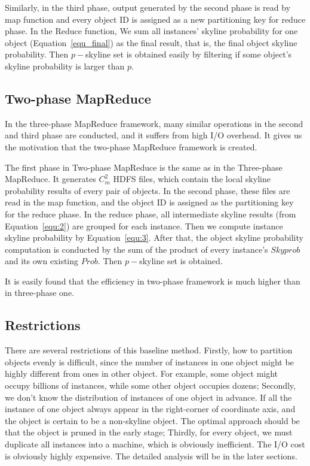 Similarly, in the third phase, output generated by the second phase is read by map function and every object ID is assigned as a new partitioning key for reduce phase. In the Reduce function, We sum all instances' skyline probability for one object (Equation~\ref{equ_final}) as the final result, that is, the final object skyline probability. Then $p-$skyline set is obtained easily by filtering if some object's skyline probability is larger than $p$.

\subsection{Two-phase MapReduce}
In the three-phase MapReduce framework, many similar operations in the second and third phase are conducted, and it suffers from high I/O overhead. It gives us the motivation that the two-phase MapReduce framework is created.

The first phase in Two-phase MapReduce is the same as in the Three-phase MapReduce. It generates \(C_{m}^{2}\) HDFS files, which contain the local skyline probability results of every pair of objects. In the second phase, these files are read in the map function, and the object ID is assigned as the partitioning key for the reduce phase. In the reduce phase, all intermediate skyline results (from Equation~\ref{equ:2}) are grouped for each instance. Then we compute instance skyline probability by Equation~\ref{equ:3}. After that, the object skyline probability computation is conducted by the sum of the product of every instance's \(Skyprob\) and its own existing \(Prob\). Then $p-$skyline set is obtained.

It is easily found that the efficiency in two-phase framework is much higher than in three-phase one.
\subsection{Restrictions}
There are several restrictions of this baseline method. Firstly, how to partition objects evenly is difficult, since the number of instances in one object might be highly different from ones in other object. For example, some object might occupy billions of instances, while some other object occupies dozens; Secondly, we don't know the distribution of instances of one object in advance. If all the instance of one object always appear in the right-corner of coordinate axis, and the object is certain to be a non-skyline object. The optimal approach should be that the object is pruned in the early stage; Thirdly, for every object, we must duplicate all instances into a machine, which is obviously inefficient. The I/O cost is obviously highly expensive. The detailed analysis will be in the later sections.


